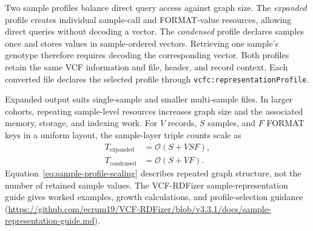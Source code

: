 \documentclass[11pt]{article}
\begin{document}
Two sample profiles balance direct query access against graph size.
The \emph{expanded} profile creates individual sample-call and FORMAT-value resources, allowing direct queries without decoding a vector.
The \emph{condensed} profile declares samples once and stores values in sample-ordered vectors.
Retrieving one sample's genotype therefore requires decoding the corresponding vector.
Both profiles retain the same VCF information and file, header, and record context.
Each converted file declares the selected profile through \texttt{vcfc:representationProfile}.

Expanded output suits single-sample and smaller multi-sample files.
In larger cohorts, repeating sample-level resources increases graph size and the associated memory, storage, and indexing work.
For $V$ records, $S$ samples, and $F$ FORMAT keys in a uniform layout, the sample-layer triple counts scale as
\begin{equation}
\begin{aligned}
T_{\mathrm{expanded}} &= \mathcal{O}(S+VSF),\\
T_{\mathrm{condensed}} &= \mathcal{O}(S+VF).
\end{aligned}
\label{eq:sample-profile-scaling}
\end{equation}
Equation~\ref{eq:sample-profile-scaling} describes repeated graph structure, not the number of retained sample values.
The VCF-RDFizer sample-representation guide gives worked examples, growth calculations, and profile-selection guidance (\url{https://github.com/ecrum19/VCF-RDFizer/blob/v3.3.1/docs/sample-representation-guide.md}).
\end{document}

